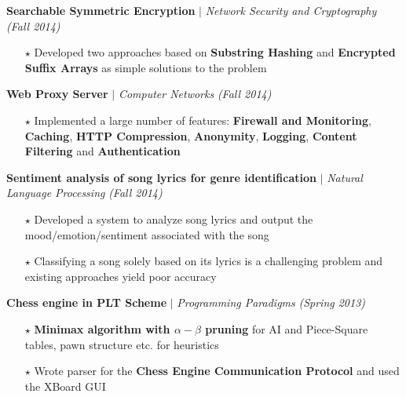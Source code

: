 \documentclass[a4paper]{article}
\begin{document}
\textbf{Searchable Symmetric Encryption} $\vert$ \emph{Network Security and Cryptography} \hfill{\sl \small (Fall 2014)}
\begin{itemize}[itemsep = -0.75 mm, leftmargin=*]
\vspace{-0.2cm}
\item[$\star$] Developed two approaches based on \textbf{Substring Hashing} and \textbf{Encrypted Suffix Arrays} as simple solutions to the problem
\end{itemize}
\textbf{Web Proxy Server} $\vert$ \emph{Computer Networks} \hfill{\sl \small (Fall 2014)}
\begin{itemize}[itemsep = -0.75 mm, leftmargin=*]
\vspace{-0.2cm}
\item[$\star$] Implemented a large number of features: \textbf{Firewall and Monitoring}, \textbf{Caching}, \textbf{HTTP Compression}, \textbf{Anonymity},  \textbf{Logging}, \textbf{Content Filtering} and \textbf{Authentication}
\end{itemize}
\textbf{Sentiment analysis of song lyrics for genre identification} $\vert$ \emph{Natural Language Processing} \hfill{\sl \small (Fall 2014)}
\begin{itemize}[itemsep = -0.75 mm, leftmargin=*]
\vspace{-0.2cm}
\item[$\star$] Developed a system to analyze song lyrics and output the mood/emotion/sentiment associated with the song
\item[$\star$] Classifying a song solely based on its lyrics is a challenging problem and existing approaches yield poor accuracy
\end{itemize}
\textbf{Chess engine in PLT Scheme} $\vert$ \emph{Programming Paradigms} \hfill{\sl \small (Spring 2013)}
\begin{itemize}[itemsep = -0.75 mm, leftmargin=*]
\vspace{-0.2cm}
\item[$\star$] \textbf{Minimax algorithm with $\alpha-\beta$ pruning} for AI and Piece-Square tables, pawn structure etc. for heuristics
\item[$\star$] Wrote parser for the \textbf{Chess Engine Communication Protocol} and used the XBoard GUI
\end{itemize}
\vspace{-10pt}
\end{document}
